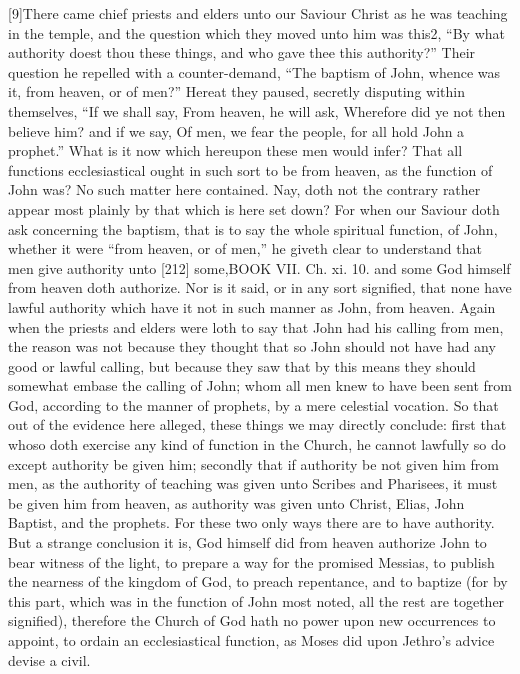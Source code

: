 [9]There came chief priests and elders unto our Saviour Christ as he was teaching in the temple, and the question which they moved unto him was this2, “By what authority doest thou these things, and who gave thee this authority?” Their question he repelled with a counter-demand, “The baptism of John, whence was it, from heaven, or of men?” Hereat they paused, secretly disputing within themselves, “If we shall say, From heaven, he will ask, Wherefore did ye not then believe him? and if we say, Of men, we fear the people, for all hold John a prophet.” What is it now which hereupon these men would infer? That all functions ecclesiastical ought in such sort to be from heaven, as the function of John was? No such matter here contained. Nay, doth not the contrary rather appear most plainly by that which is here set down? For when our Saviour doth ask concerning the baptism, that is to say the whole spiritual function, of John, whether it were “from heaven, or of men,” he giveth clear to understand that men give authority unto [212] some,BOOK VII. Ch. xi. 10. and some God himself from heaven doth authorize. Nor is it said, or in any sort signified, that none have lawful authority which have it not in such manner as John, from heaven. Again when the priests and elders were loth to say that John had his calling from men, the reason was not because they thought that so John should not have had any good or lawful calling, but because they saw that by this means they should somewhat embase the calling of John; whom all men knew to have been sent from God, according to the manner of prophets, by a mere celestial vocation. So that out of the evidence here alleged, these things we may directly conclude: first that whoso doth exercise any kind of function in the Church, he cannot lawfully so do except authority be given him; secondly that if authority be not given him from men, as the authority of teaching was given unto Scribes and Pharisees, it must be given him from heaven, as authority was given unto Christ, Elias, John Baptist, and the prophets. For these two only ways there are to have authority. But a strange conclusion it is, God himself did from heaven authorize John to bear witness of the light, to prepare a way for the promised Messias, to publish the nearness of the kingdom of God, to preach repentance, and to baptize (for by this part, which was in the function of John most noted, all the rest are together signified), therefore the Church of God hath no power upon new occurrences to appoint, to ordain an ecclesiastical function, as Moses did upon Jethro’s advice devise a civil.

